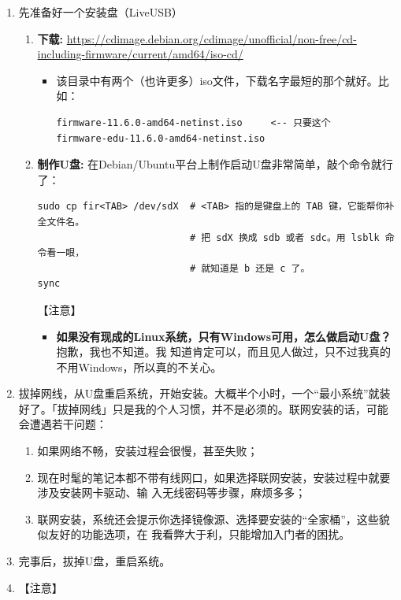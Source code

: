 \documentclass{wx672ctexart} \usepackage{hyperref}
\begin{document}
\begin{enumerate}
\item 先准备好一个安装盘（LiveUSB）
\begin{enumerate}
\item \textbf{下载:} \url{https://cdimage.debian.org/cdimage/unofficial/non-free/cd-including-firmware/current/amd64/iso-cd/}
\begin{itemize}
\item 该目录中有两个（也许更多）iso文件，下载名字最短的那个就好。比如：
\begin{verbatim}
firmware-11.6.0-amd64-netinst.iso     <-- 只要这个
firmware-edu-11.6.0-amd64-netinst.iso        
\end{verbatim}
\end{itemize}

\item \textbf{制作U盘:} 在Debian/Ubuntu平台上制作启动U盘非常简单，敲个命令就行了：
\begin{verbatim}
sudo cp fir<TAB> /dev/sdX  # <TAB> 指的是键盘上的 TAB 键，它能帮你补全文件名。
						   # 把 sdX 换成 sdb 或者 sdc。用 lsblk 命令看一眼，
						   # 就知道是 b 还是 c 了。
sync
\end{verbatim}
【注意】
\begin{itemize}
\item \textbf{如果没有现成的Linux系统，只有Windows可用，怎么做启动U盘？} 抱歉，我也不知道。我
知道肯定可以，而且见人做过，只不过我真的不用Windows，所以真的不关心。
\end{itemize}
\end{enumerate}
\item 拔掉网线，从U盘重启系统，开始安装。大概半个小时，一个“最小系统”就装
好了。「拔掉网线」只是我的个人习惯，并不是必须的。联网安装的话，可能会遭遇若干问题：
\begin{enumerate}
\item 如果网络不畅，安装过程会很慢，甚至失败；
\item 现在时髦的笔记本都不带有线网口，如果选择联网安装，安装过程中就要涉及安装网卡驱动、输
入无线密码等步骤，麻烦多多；
\item 联网安装，系统还会提示你选择镜像源、选择要安装的“全家桶”，这些貌似友好的功能选项，在
我看弊大于利，只能增加入门者的困扰。
\end{enumerate}
\item 完事后，拔掉U盘，重启系统。
\item 【注意】
\begin{itemize}

\end{itemize}
\end{enumerate}
\end{document}
